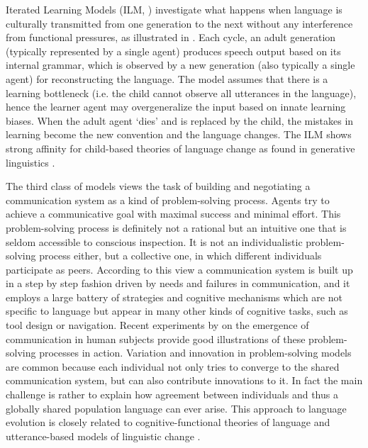  Iterated Learning Models (ILM, \citealt{brighton05cultural, kirby01spontaneous, kirby02emergence, kirby04from, smith03iterated}) investigate what happens when language is culturally transmitted from one generation to the next without any interference from functional pressures, as illustrated in . Each cycle, an adult generation (typically represented by a single agent) produces speech output based on its internal grammar, which is observed by a new generation (also typically a single agent) for reconstructing the language. The model assumes that there is a learning bottleneck (i.e. the child cannot observe all utterances in the language), hence the learner agent may overgeneralize the input based on innate learning biases. When the adult agent `dies' and is replaced by the child, the mistakes in learning become the new convention and the language changes. The ILM shows strong affinity for child-based theories of language change as found in generative linguistics \citep{king69historical}.

The third class of models views the task of building and negotiating a communication system as a kind of problem-solving process. Agents try to achieve a communicative goal with maximal success and minimal effort. This problem-solving process is definitely not a rational but an intuitive one that is seldom accessible to conscious inspection. It is not an individualistic problem-solving process either, but a collective one, in which different individuals participate as peers. According to this view a communication system is built up in a step by step fashion driven by needs and failures in communication, and it employs a large battery of strategies and cognitive mechanisms which are not specific to language but appear in many other kinds of cognitive tasks, such as tool design or navigation. Recent experiments by \citet{galantucci05experimental} on the emergence of communication in human subjects provide good illustrations of these problem-solving processes in action. Variation and innovation in problem-solving models are common because each individual not only tries to converge to the shared communication system, but can also contribute innovations to it. In fact the main challenge is rather to explain how agreement between individuals and thus a globally shared population language can ever arise. This approach to language evolution is closely related to cognitive-functional theories of language and utterance-based models of linguistic change \citep{croft00explaining, croft05relevance}.

